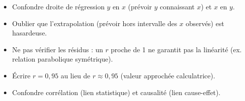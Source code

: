\documentclass[11pt]{article}
\begin{document}
\begin{attention}
\begin{itemize}
    \item Confondre droite de régression $y$ en $x$ (prévoir $y$ connaissant $x$) et $x$ en $y$.
    \item Oublier que l'extrapolation (prévoir hors intervalle des $x$ observés) est hasardeuse.
    \item Ne pas vérifier les résidus : un $r$ proche de 1 ne garantit pas la linéarité (ex. relation parabolique symétrique).
    \item Écrire $r = 0,95$ au lieu de $r \approx 0,95$ (valeur approchée calculatrice).
    \item Confondre corrélation (lien statistique) et causalité (lien cause-effet).
\end{itemize}
\end{attention}
\end{document}
